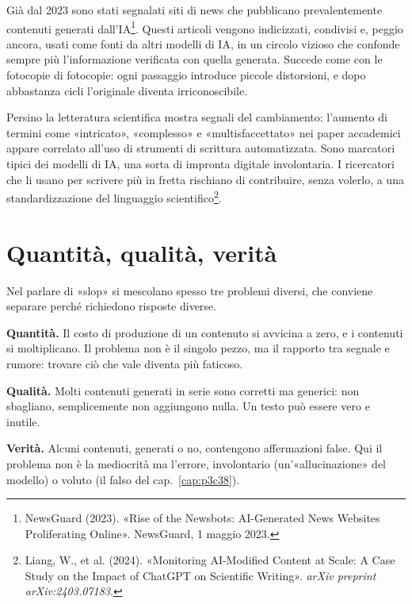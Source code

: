 Già dal 2023 sono stati segnalati siti di news che pubblicano prevalentemente contenuti generati dall'IA\footnote{NewsGuard (2023). «Rise of the Newsbots: AI-Generated News Websites Proliferating Online». NewsGuard, 1 maggio 2023.}. Questi articoli vengono indicizzati, condivisi e, peggio ancora, usati come fonti da altri modelli di IA, in un circolo vizioso che confonde sempre più l'informazione verificata con quella generata. Succede come con le fotocopie di fotocopie: ogni passaggio introduce piccole distorsioni, e dopo abbastanza cicli l'originale diventa irriconoscibile.

Persino la letteratura scientifica mostra segnali del cambiamento: l'aumento di termini come «intricato», «complesso» e «multisfaccettato» nei paper accademici appare correlato all'uso di strumenti di scrittura automatizzata. Sono marcatori tipici dei modelli di IA, una sorta di impronta digitale involontaria. I ricercatori che li usano per scrivere più in fretta rischiano di contribuire, senza volerlo, a una standardizzazione del linguaggio scientifico\footnote{Liang, W., et al. (2024). «Monitoring AI-Modified Content at Scale: A Case Study on the Impact of ChatGPT on Scientific Writing». \textit{arXiv preprint arXiv:2403.07183}.}.

\section{Quantità, qualità, verità}
\label{sec:p4c39-tre-assi}

Nel parlare di «slop» si mescolano spesso tre problemi diversi, che conviene separare perché richiedono risposte diverse.

\begin{concetto}
\textbf{Quantità.} Il costo di produzione di un contenuto si avvicina a zero, e i contenuti si moltiplicano. Il problema non è il singolo pezzo, ma il rapporto tra segnale e rumore: trovare ciò che vale diventa più faticoso.

\textbf{Qualità.} Molti contenuti generati in serie sono corretti ma generici: non sbagliano, semplicemente non aggiungono nulla. Un testo può essere vero e inutile.

\textbf{Verità.} Alcuni contenuti, generati o no, contengono affermazioni false. Qui il problema non è la mediocrità ma l'errore, involontario (un'«allucinazione» del modello) o voluto (il falso del cap.~\ref{cap:p3c38}).
\end{concetto}

